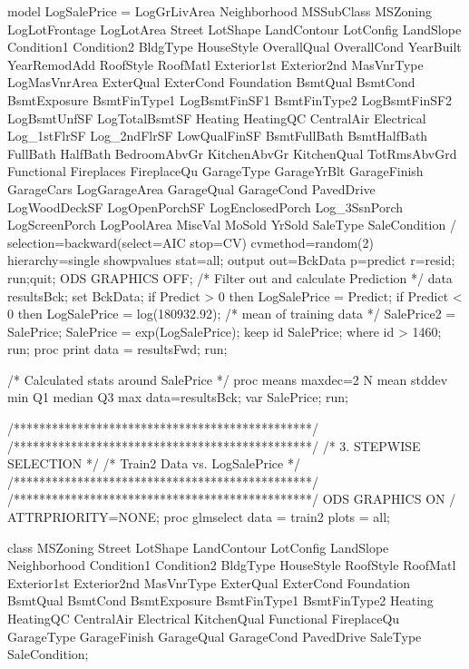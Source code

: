 model LogSalePrice = LogGrLivArea Neighborhood MSSubClass MSZoning LogLotFrontage LogLotArea 
Street LotShape LandContour LotConfig LandSlope Condition1 Condition2 BldgType HouseStyle 
OverallQual OverallCond YearBuilt YearRemodAdd RoofStyle RoofMatl Exterior1st Exterior2nd 
MasVnrType LogMasVnrArea ExterQual ExterCond Foundation BsmtQual BsmtCond BsmtExposure 
BsmtFinType1 LogBsmtFinSF1 BsmtFinType2 LogBsmtFinSF2 LogBsmtUnfSF LogTotalBsmtSF Heating 
HeatingQC CentralAir Electrical Log_1stFlrSF Log_2ndFlrSF LowQualFinSF BsmtFullBath BsmtHalfBath 
FullBath HalfBath BedroomAbvGr KitchenAbvGr KitchenQual TotRmsAbvGrd 
Functional Fireplaces FireplaceQu GarageType GarageYrBlt GarageFinish GarageCars LogGarageArea 
GarageQual GarageCond PavedDrive LogWoodDeckSF LogOpenPorchSF LogEnclosedPorch Log_3SsnPorch 
LogScreenPorch LogPoolArea MiscVal MoSold YrSold SaleType SaleCondition 
/ selection=backward(select=AIC stop=CV) cvmethod=random(2) hierarchy=single showpvalues stat=all;
output out=BckData p=predict r=resid;
run;quit;
ODS GRAPHICS OFF; 
/* Filter out and calculate Prediction */
data resultsBck;
	set BckData;
	if Predict > 0 then LogSalePrice = Predict;
	if Predict < 0 then LogSalePrice = log(180932.92);  /* mean of training data */
	SalePrice2 = SalePrice;
	SalePrice = exp(LogSalePrice);
	keep id SalePrice;
	where id > 1460;
run;
proc print data = resultsFwd;
run;

/* Calculated stats around SalePrice */
proc means maxdec=2 N mean stddev min Q1 median Q3 max data=resultsBck;
var SalePrice;
run;


/***********************************************/
/***********************************************/
/*          3. STEPWISE SELECTION              */
/*         Train2 Data vs. LogSalePrice        */
/***********************************************/
/***********************************************/
ODS GRAPHICS ON / ATTRPRIORITY=NONE; 
proc glmselect data = train2 plots = all;  

class MSZoning Street LotShape LandContour LotConfig LandSlope Neighborhood 
Condition1 Condition2 BldgType HouseStyle RoofStyle RoofMatl Exterior1st Exterior2nd 
MasVnrType ExterQual ExterCond Foundation BsmtQual BsmtCond BsmtExposure BsmtFinType1 
BsmtFinType2 Heating HeatingQC CentralAir Electrical KitchenQual Functional FireplaceQu 
GarageType GarageFinish GarageQual GarageCond PavedDrive
SaleType SaleCondition; 

